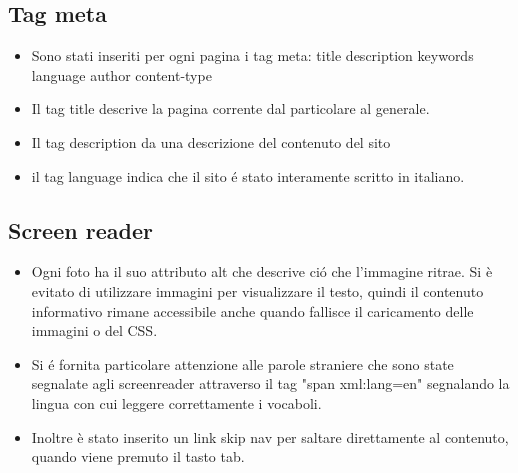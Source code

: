 \documentclass[12pt]{article}
\begin{document}
		
			\subsection{Tag meta}
			\begin{itemize}
				\item Sono stati inseriti per ogni pagina i tag meta:
				\subitem title
				\subitem description
				\subitem keywords
				\subitem language 
				\subitem author
				\subitem content-type

				\item Il tag title descrive la pagina corrente dal particolare al generale.
				\item Il tag description da una descrizione del contenuto del sito

				\item  il tag language indica che il sito \'e stato interamente scritto in italiano. 
			\end{itemize}
			\subsection{Screen reader}
			\begin{itemize}
				\item Ogni foto ha il suo attributo alt che descrive ci\'o che l'immagine ritrae.
				Si è evitato di utilizzare immagini per visualizzare il testo, quindi il contenuto informativo rimane accessibile anche quando fallisce il caricamento delle immagini o del CSS.
				\item Si \'e fornita particolare attenzione alle parole straniere che sono state segnalate agli screenreader attraverso il tag "span xml:lang=en" segnalando la lingua con cui leggere correttamente i vocaboli. 
				\item Inoltre \`e stato inserito un link skip nav per saltare direttamente al contenuto, quando viene premuto il tasto tab.
			\end{itemize}
\end{document}
